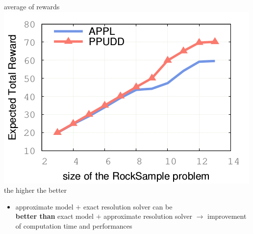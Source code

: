\documentclass[12pt,svgnames,table]{beamer}
\begin{document}
\begin{frame}
{\begin{minipage}{0.43\linewidth}
	{\color{orange} average of rewards} \\
\vspace{-0.03cm}  
	\includegraphics[scale=0.4]{courbePerfTime.png} \\
{ \color{gggreen} the higher the better}
	\end{minipage}

\vspace{-0.1cm}
\begin{alertblock}{}
\begin{itemize}
\item approximate model $+$ exact resolution solver can be \\
\textbf{better than} exact model $+$ approximate resolution solver
$\rightarrow$ improvement of computation time and performances
\end{itemize}
\end{alertblock}
}
\end{frame}



\newcommand{\grillethird}{
 \begin{tikzpicture}[overlay,remember picture]
   \begin{scope}[shift={(current page.south west)}]
	\tikzstyle{vertexBIGRED}=[fill=red!30,draw=red, minimum width=320pt, minimum height=30pt,line width=1pt,inner sep=5pt,rounded corners]
	\node[vertexBIGRED] at (6.5,7.4) {};
	\node at (6.5,7.4) {PPUDD outperforms its probabilistic counterpart};
   \end{scope}
 \end{tikzpicture}
 }
\end{document}
